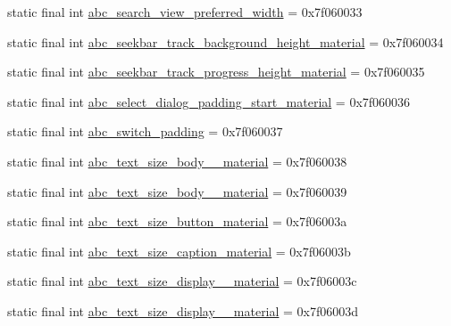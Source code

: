 \begin{DoxyCompactItemize}
\item 
static final int \mbox{\hyperlink{classandroid_1_1support_1_1v7_1_1appcompat_1_1R_1_1dimen_acc05237c67c19808a867d37cfe0f18db}{abc\+\_\+search\+\_\+view\+\_\+preferred\+\_\+width}} = 0x7f060033
\item 
static final int \mbox{\hyperlink{classandroid_1_1support_1_1v7_1_1appcompat_1_1R_1_1dimen_a9acb31a916e1655607b008b15a477f93}{abc\+\_\+seekbar\+\_\+track\+\_\+background\+\_\+height\+\_\+material}} = 0x7f060034
\item 
static final int \mbox{\hyperlink{classandroid_1_1support_1_1v7_1_1appcompat_1_1R_1_1dimen_a93d886dc13826a74ce97e7dddb0d699c}{abc\+\_\+seekbar\+\_\+track\+\_\+progress\+\_\+height\+\_\+material}} = 0x7f060035
\item 
static final int \mbox{\hyperlink{classandroid_1_1support_1_1v7_1_1appcompat_1_1R_1_1dimen_a8873d44fdbd5c89f6cb77c11a76ad403}{abc\+\_\+select\+\_\+dialog\+\_\+padding\+\_\+start\+\_\+material}} = 0x7f060036
\item 
static final int \mbox{\hyperlink{classandroid_1_1support_1_1v7_1_1appcompat_1_1R_1_1dimen_a410e47edf1b65780848bbb4c9f79252c}{abc\+\_\+switch\+\_\+padding}} = 0x7f060037
\item 
static final int \mbox{\hyperlink{classandroid_1_1support_1_1v7_1_1appcompat_1_1R_1_1dimen_ab4f998523b1a531044f5740429ff31e1}{abc\+\_\+text\+\_\+size\+\_\+body\+\_\+\_\+material}} = 0x7f060038
\item 
static final int \mbox{\hyperlink{classandroid_1_1support_1_1v7_1_1appcompat_1_1R_1_1dimen_aef8ce3f43ce7679b6db3d520871ff677}{abc\+\_\+text\+\_\+size\+\_\+body\+\_\+\_\+material}} = 0x7f060039
\item 
static final int \mbox{\hyperlink{classandroid_1_1support_1_1v7_1_1appcompat_1_1R_1_1dimen_aef7a187b695f9a1e0478bfa4c883d0d9}{abc\+\_\+text\+\_\+size\+\_\+button\+\_\+material}} = 0x7f06003a
\item 
static final int \mbox{\hyperlink{classandroid_1_1support_1_1v7_1_1appcompat_1_1R_1_1dimen_a46ea30bfdc5baacefc0d32d3ce1ba88c}{abc\+\_\+text\+\_\+size\+\_\+caption\+\_\+material}} = 0x7f06003b
\item 
static final int \mbox{\hyperlink{classandroid_1_1support_1_1v7_1_1appcompat_1_1R_1_1dimen_a43b54457d6e97f9b1b66699cf5c99e5d}{abc\+\_\+text\+\_\+size\+\_\+display\+\_\+\_\+material}} = 0x7f06003c
\item 
static final int \mbox{\hyperlink{classandroid_1_1support_1_1v7_1_1appcompat_1_1R_1_1dimen_a7b93df89a088e5eb5c60634410dd3025}{abc\+\_\+text\+\_\+size\+\_\+display\+\_\+\_\+material}} = 0x7f06003d

\end{DoxyCompactItemize}
